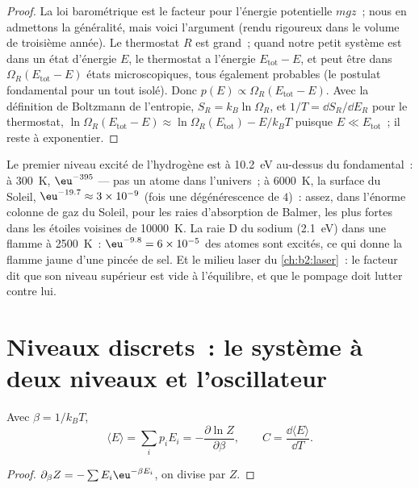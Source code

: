 \begin{proof}
La loi barométrique est le facteur pour l'énergie potentielle $mgz$~; nous
en admettons la généralité, mais voici l'argument (rendu rigoureux dans le
volume de troisième année). Le thermostat $R$ est grand~; quand notre petit système est dans
un état d'énergie $E$, le thermostat a l'énergie $E_{\text{tot}} -
E$, et peut être dans $\Omega_R(E_{\text{tot}} - E)$ états microscopiques, tous
également probables (le postulat fondamental pour un tout isolé). Donc
$p(E) \propto \Omega_R(E_{\text{tot}} - E)$. Avec la définition de Boltzmann
de l'entropie, $S_R = k_B\ln\Omega_R$, et $1/T = \dd S_R/\dd E_R$ pour le
thermostat, $\ln\Omega_R(E_{\text{tot}} - E) \approx \ln\Omega_R(E_{\text{tot}})
- E/k_BT$ puisque $E \ll E_{\text{tot}}$~; il reste à exponentier.
\end{proof}

\begin{example}\label{ex:b2:boltzmann-factor:levels}
Le premier niveau excité de l'hydrogène est à \qty{10.2}{eV} au-dessus du
fondamental~: à \qty{300}{K}, $\eu^{-395}$ --- pas un atome dans l'univers~; à
\qty{6000}{K}, la surface du Soleil, $\eu^{-19.7} \approx 3 \times 10^{-9}$ (fois
une dégénérescence de $4$)~: assez, dans l'énorme colonne de gaz du Soleil, pour les
raies d'absorption de Balmer, les plus fortes dans les étoiles voisines de \qty{10000}{K}.
La raie D du sodium (\qty{2.1}{eV}) dans une flamme à \qty{2500}{K}~: $\eu^{-9.8} = 6
\times 10^{-5}$ des atomes sont excités, ce qui donne la flamme jaune d'une
pincée de sel. Et le milieu laser du \cref{ch:b2:laser}~: le facteur
dit que son niveau supérieur est vide à l'équilibre, et que le pompage doit lutter
contre lui.
\end{example}

\section{Niveaux discrets~: le système à deux niveaux et l'oscillateur}

\begin{proposition}\label{prop:b2:boltzmann-factor:meanE}
Avec $\beta = 1/k_BT$,
\[
\langle E\rangle = \sum_ip_iE_i = -\frac{\partial\ln Z}{\partial\beta}, \qquad
C = \frac{\dd\langle E\rangle}{\dd T} .
\]
\end{proposition}

\begin{proof}
$\partial_\beta Z = -\sum E_i\eu^{-\beta E_i}$, on divise par $Z$.
\end{proof}

